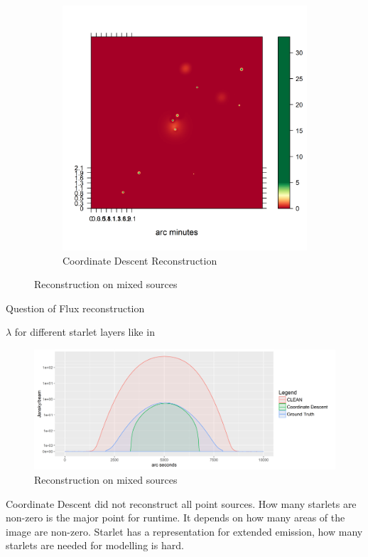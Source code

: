 \begin{figure}[h]
\begin{subfigure}[b]{0.4\linewidth}
		\includegraphics[width=\linewidth, trim={0.2in, 0.2in, 0, 0.2in}, clip]{./chapters/20.results/mixed/mixed_cd.png}
		\caption{Coordinate Descent Reconstruction}
		\label{results:mixed:cd}
	\end{subfigure}
	\caption{Reconstruction on mixed sources}
	\label{results:mixed}
\end{figure}

Question of Flux reconstruction

 $\lambda$ for different starlet layers like in \cite{girard2015sparse}

\begin{figure}[h]
	\centering
	\includegraphics[width=0.8\linewidth]{./chapters/20.results/mixed/mixed_contour.png}
	\caption{Reconstruction on mixed sources}
	\label{results:mixed:contour}
\end{figure}

Coordinate Descent did not reconstruct all point sources. How many starlets are non-zero is the major point for runtime. It depends on how many areas of the image are non-zero. Starlet has a representation for extended emission, how many starlets are needed for modelling is hard.

